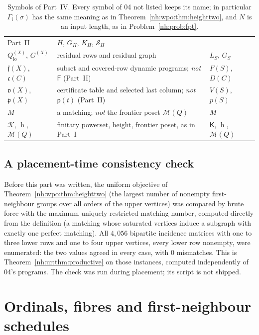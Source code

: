 \documentclass[11pt,a4paper]{article}
\theoremstyle{definition}
\theoremstyle{remark}
\newcommand{\K}{\mathcal K}
\newcommand{\M}{\mathcal M}
\newcommand{\hgt}{\operatorname{h}}
\newcommand{\Fdp}{\mathsf F}
\newcommand{\Qlo}{Q_{\mathrm{lo}}}
\begin{document}
\begin{table}[htbp]
\begin{tabularx}{\linewidth}{@{}>{\raggedright\arraybackslash}p{.22\linewidth}>{\raggedright\arraybackslash}X>{\raggedright\arraybackslash}p{.12\linewidth}@{}}
Part~II & $H$, $G_H$, $K_H$, $\mathscr S_H$\\
$\Qlo^{(X)}$, $G^{(X)}$ & residual rows and residual graph & $L_S$, $G_S$\\
$\mathfrak f(X)$, $\mathfrak c(C)$ & subset and covered-row dynamic
programs; \emph{not} $\Fdp$ (Part~II) & $F(S)$, $D(C)$\\
$\mathfrak v(X)$, $\mathfrak p(X)$ & certificate table and selected last
column; \emph{not} $\mathsf p(t)$ (Part~II) & $V(S)$, $p(S)$\\
$M$ & a matching; \emph{not} the frontier poset $\M(Q)$ & $M$\\
$\K$, $\hgt$, $\M(Q)$ & finitary powerset, height, frontier poset, as in
Part~I & $\mathsf K$, $\operatorname{h}$, $\mathcal M(Q)$\\
\bottomrule
\end{tabularx}
\caption{Symbols of Part~IV. Every symbol of 04 not listed keeps its name;
in particular $\Gamma_i(\sigma)$ has the same meaning as in
Theorem~\ref{nh:wpo:thm:heighttwo}, and $N$ is an input length, as in
Problem~\ref{nh:prob:fpt}.}
\label{nh:ur:tab:notation}
\end{table}

\subsection{A placement-time consistency check}\label{nh:ur:sec:crosscheck}

Before this part was written, the uniform objective of
Theorem~\ref{nh:wpo:thm:heighttwo} (the largest number of nonempty
first-neighbour groups over all orders of the upper vertices) was compared
by brute force with the maximum uniquely restricted matching number, computed
directly from the definition (a matching whose saturated vertices induce a
subgraph with exactly one perfect matching). All $4{,}056$ bipartite
incidence matrices with one to three lower rows and one to four upper
vertices, every lower row nonempty, were enumerated: the two values agreed in
every case, with $0$ mismatches. This is Theorem~\ref{nh:ur:thm:productive}
on those instances, computed independently of 04's programs. The check was
run during placement; its script is not shipped.

\section{Ordinals, fibres and first-neighbour schedules}\label{nh:ur:sec:setup}
\setcounter{equation}{0}
\end{document}
